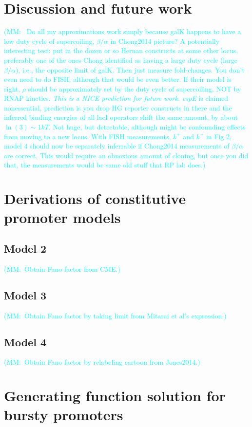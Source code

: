 \documentclass[12pt]{article}%
\newcommand{\mmnote}[1]{\textcolor{cyan}{(MM:~#1)}}
\begin{document}
\section{Discussion and future work}
\mmnote{
Do all my approximations work simply because galK happens to have
a low duty cycle of supercoiling, $\beta/\alpha$ in Chong2014
picture? A potentially interesting test: put in the dozen or so
Hernan constructs at some other locus, preferably one of the ones
Chong identified as having a large duty cycle (large $\beta/\alpha$),
i.e., the opposite limit of galK. Then just measure fold-changes.
You don't even need to do FISH, although that would be even
better. If their model is right, $\rho$ should be approximately
set by the duty cycle of supercoiling, NOT by RNAP kinetics.
\textit{This is a NICE prediction for future work.} \textit{cspE}
is claimed nonessential, prediction is you drop HG reporter
constructs in there and the inferred binding energies of all lacI
operators shift the same amount, by about $\ln(3)\sim 1kT$. Not
huge, but detectable, although might be confounding effects from
moving to a new locus. With FISH measurements, $k^+$ and $k^-$ in
Fig 2, model 4 should now be separately inferrable if Chong2014
measurements of $\beta/\alpha$ are correct. This would require an
obnoxious amount of cloning, but once you did that, the
measurements would be same old stuff that RP lab does.}

\appendix

\section{Derivations of constitutive promoter models}
\subsection{Model 2}
\mmnote{Obtain Fano factor from CME.}
\subsection{Model 3}
\mmnote{Obtain Fano factor by taking limit from Mitarai et al's expression.}
\subsection{Model 4}
\mmnote{Obtain Fano factor by relabeling cartoon from Jones2014.}

\section{Generating function solution for bursty promoters}
\end{document}
